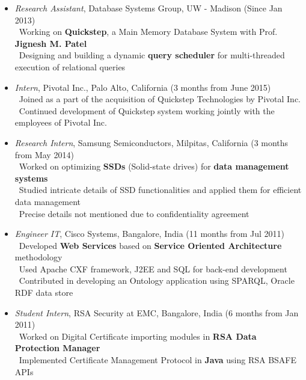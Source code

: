 \documentclass[11pt]{article}
\begin{document}
\begin{itemize}\addtolength{\itemsep}{-0.5\baselineskip}
	\item{\textit{Research Assistant}, Database Systems Group, UW - Madison \hfill (Since Jan 2013)}\\
		\textendash\ Working on \textbf{Quickstep}, a Main Memory Database System with Prof. \textbf{Jignesh M. Patel} \\
		\textendash\ Designing and building a dynamic \textbf{query scheduler} for multi-threaded execution of relational queries \\
	\item{\textit{Intern}, Pivotal Inc., Palo Alto, California \hfill (3 months from June 2015)}\\
	\textendash\ Joined as a part of the acquisition of Quickstep Technologies by Pivotal Inc.\\
	\textendash\ Continued development of Quickstep system working jointly with the employees of Pivotal Inc.\\
	\item{\textit{Research Intern}, Samsung Semiconductors, Milpitas, California \hfill (3 months from May 2014)}\\
		\textendash\ Worked on optimizing \textbf{SSDs} (Solid-state drives) for \textbf{data management systems} \\
		\textendash\ Studied intricate details of SSD functionalities and applied them for efficient data management \\
		\textendash\ Precise details not mentioned due to confidentiality agreement\\
	\item{\textit{Engineer IT}, Cisco Systems, Bangalore, India \hfill (11 months from Jul 2011)}\\
		\textendash\ Developed \textbf{Web Services} based on \textbf{Service Oriented Architecture} methodology\\
		\textendash\ Used Apache CXF framework, J2EE and SQL for back-end development\\
		\textendash\ Contributed in developing an Ontology application using SPARQL, Oracle RDF data store\\
	\item{\textit{Student Intern}, RSA Security at EMC, Bangalore, India \hfill (6 months from Jan 2011)}\\
		\textendash\ Worked on Digital Certificate importing modules in \textbf{RSA Data Protection Manager}\\
		\textendash\ Implemented Certificate Management Protocol in \textbf{Java} using RSA BSAFE APIs\\
\end{itemize}
\end{document}
